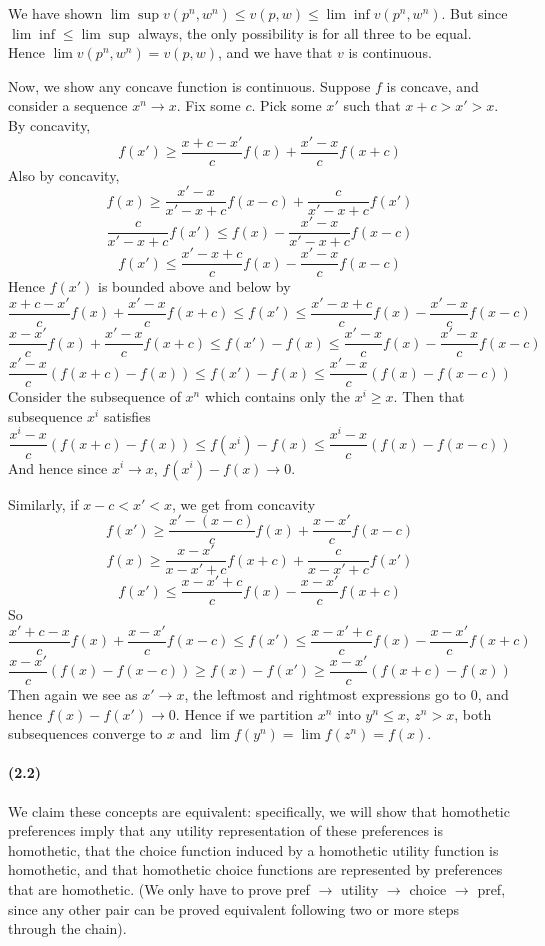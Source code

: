 \documentclass[10pt,letter]{article}
\begin{document}
We have shown $\lim \sup v(p^n, w^n) \le v(p,w) \le \lim \inf v(p^n, w^n)$. But since $\lim \inf \le \lim \sup$ always, the only possibility is for all three to be equal. Hence $\lim v(p^n, w^n) = v(p,w)$, and we have that $v$ is continuous.

Now, we show any concave function is continuous. Suppose $f$ is concave, and consider a sequence $x^n \to x$. Fix some $c$. Pick some $x'$ such that $x+c > x' > x$. By concavity,
\[ f(x') \ge \frac{x + c -x'}{c}f(x) + \frac{x'-x}{c}f(x + c)  \]
Also by concavity,
\[ f(x) \ge \frac{x'-x}{x'-x+c}f(x-c) + \frac{c}{x'-x+c}f(x') \]
\[ \frac{c}{x'-x+c}f(x') \le f(x) - \frac{x'-x}{x'-x+c}f(x-c) \]
\[ f(x') \le \frac{x'-x+c}{c}f(x) - \frac{x'-x}{c}f(x-c) \]
Hence $f(x')$ is bounded above and below by
\[ \frac{x + c -x'}{c}f(x) + \frac{x'-x}{c}f(x + c) \le f(x') \le \frac{x'-x+c}{c}f(x) - \frac{x'-x}{c}f(x-c)\]
\[ \frac{x -x'}{c}f(x) + \frac{x'-x}{c}f(x + c) \le f(x') - f(x) \le \frac{x'-x}{c}f(x) - \frac{x'-x}{c}f(x-c)\]
\[ \frac{x'-x}{c}(f(x+c) - f(x)) \le f(x') - f(x) \le \frac{x'-x}{c}(f(x) - f(x-c)) \]
Consider the subsequence of $x^n$ which contains only the $x^i \ge x$. Then that subsequence $x^i$ satisfies
\[ \frac{x^i-x}{c}(f(x+c) - f(x)) \le f(x^i) - f(x) \le \frac{x^i-x}{c}(f(x) - f(x-c)) \]
And hence since $x^i \to x$, $f(x^i) - f(x) \to 0$.

Similarly, if $x-c < x' < x$, we get from concavity
\[ f(x') \ge \frac{x' - (x- c)}{c}f(x) + \frac{x-x'}{c}f(x - c)  \]
\[ f(x) \ge \frac{x-x'}{x-x'+c}f(x+c) + \frac{c}{x-x'+c}f(x') \]
\[ f(x') \le \frac{x-x'+c}{c}f(x) - \frac{x-x'}{c}f(x+c) \]
So
\[ \frac{x' + c - x}{c}f(x) + \frac{x-x'}{c}f(x - c) \le f(x') \le \frac{x-x'+c}{c}f(x) - \frac{x-x'}{c}f(x+c) \]
\[ \frac{x-x'}{c}(f(x) - f(x - c) ) \ge f(x) - f(x') \ge \frac{x-x'}{c}(f(x+c) - f(x)) \]
Then again we see as $x' \to x$, the leftmost and rightmost expressions go to $0$, and hence $f(x) -f(x') \to 0$. Hence if we partition $x^n$ into $y^n \le x$, $z^n > x$, both subsequences converge to $x$ and $\lim f(y^n) = \lim f(z^n) = f(x)$.

\paragraph{(2.2)}
We claim these concepts are equivalent: specifically, we will show that homothetic preferences imply that any utility representation of these preferences is homothetic, that the choice function induced by a homothetic utility function is homothetic, and that homothetic choice functions are represented by preferences that are homothetic. (We only have to prove pref $\to$ utility $\to$ choice $\to$ pref, since any other pair can be proved equivalent following two or more steps through the chain).
\end{document}
